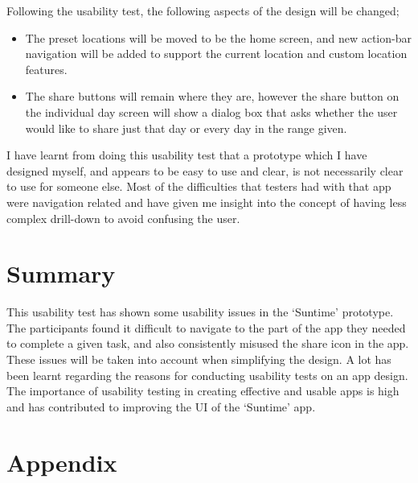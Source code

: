 \documentclass[11pt,english,numbers=endperiod,parskip=half]{scrartcl}
\begin{document}
	Following the usability test, the following aspects of the design will be
	changed;
	\begin{itemize}
		\item{
			The preset locations will be moved to be the home screen, and new
			action-bar navigation will be added to support the current location and
			custom location features. \cite{phandroid}
		}

		\item{
			The share buttons will remain where they are, however the share button on
			the individual day screen will show a dialog box that asks whether the
			user would like to share just that day or every day in the range given.
		}
	\end{itemize}

	I have learnt from doing this usability test that a prototype which I have
	designed myself, and appears to be easy to use and clear, is not necessarily
	clear to use for someone else. Most of the difficulties that testers had with
	that app were navigation related and have given me insight into the concept of
	having less complex drill-down to avoid confusing the user. \cite{msdn}

\section{Summary}
This usability test has shown some usability issues in the `Suntime' prototype.
The participants found it difficult to navigate to the part of the app they
needed to complete a given task, and also consistently misused the share icon in
the app. These issues will be taken into account when simplifying the design.
A lot has been learnt regarding the reasons for conducting usability tests on
an app design. The importance of usability testing in creating effective and
usable apps is high and has contributed to improving the UI of the `Suntime' app.

{}


\section{Appendix}
	
	
	
	
	
	
	
\end{document}

